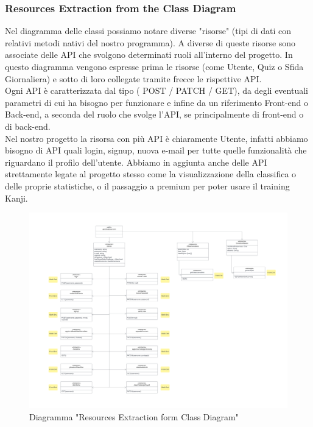 \subsubsection{Resources Extraction from the Class Diagram}
Nel diagramma delle classi possiamo notare diverse "risorse" (tipi di dati con relativi metodi nativi del nostro programma). A diverse di queste risorse sono associate delle API che svolgono determinati ruoli all'interno del progetto. In questo diagramma vengono espresse prima le risorse (come Utente, Quiz o Sfida Giornaliera) e sotto di loro collegate tramite frecce le rispettive API. \\
Ogni API è caratterizzata dal tipo ( POST / PATCH / GET), da degli eventuali parametri di cui ha bisogno per funzionare e infine da un riferimento Front-end o Back-end, a seconda del ruolo che svolge l'API, se principalmente di front-end o di back-end. \\
Nel nostro progetto la risorsa con più API è chiaramente Utente, infatti abbiamo bisogno di API quali login, signup, nuova e-mail per tutte quelle funzionalità che riguardano il profilo dell'utente. Abbiamo in aggiunta anche delle API strettamente legate al progetto stesso come la visualizzazione della classifica o delle proprie statistiche, o il passaggio a premium per poter usare il training Kanji. 
\begin{figure}[!h]
\centering
\includegraphics[scale=0.05]{images/From Class Diagram to API implementation.png}
\caption{Diagramma "Resources Extraction form Class Diagram"}
\label{fig:From Class Diagram to API implementation.png}
\end{figure}

